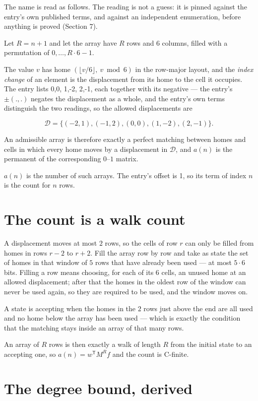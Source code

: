 \documentclass[11pt]{article}
\theoremstyle{definition}
\begin{document}
The name is read as follows. The reading is not a guess: it is pinned against the entry's own published terms, and against an independent enumeration, before anything is proved (Section 7).

Let $R = n + 1$ and let the array have $R$ rows and $6$ columns, filled with a permutation of $0,\dots,R\cdot6-1$.

The value $v$ has home $(\lfloor v/6\rfloor,\ v \bmod 6)$ in the row-major layout, and the {\itshape index change} of an element is the displacement from its home to the cell it occupies. The entry lists 0,0, 1,-2, 2,-1, each together with its negative --- the entry's $\pm(.,.)$ negates the displacement as a whole, and the entry's own terms distinguish the two readings, so the allowed displacements are

\[\mathcal{D} = \{(-2,1), (-1,2), (0,0), (1,-2), (2,-1)\}.\]

An admissible array is therefore exactly a perfect matching between homes and cells in which every home moves by a displacement in $\mathcal{D}$, and $a(n)$ is the permanent of the corresponding $0$--$1$ matrix.

$a(n)$ is the number of such arrays. The entry's offset is 1, so its term of index $n$ is the count for $n$ rows.

\section{The count is a walk count}

A displacement moves at most $2$ rows, so the cells of row $r$ can only be filled from homes in rows $r-2$ to $r+2$. Fill the array row by row and take as state the set of homes in that window of $5$ rows that have already been used --- at most $5\cdot6$ bits. Filling a row means choosing, for each of its $6$ cells, an unused home at an allowed displacement; after that the homes in the oldest row of the window can never be used again, so they are required to be used, and the window moves on.

A state is accepting when the homes in the $2$ rows just above the end are all used and no home below the array has been used --- which is exactly the condition that the matching stays inside an array of that many rows.

An array of $R$ rows is then exactly a walk of length $R$ from the initial state to an accepting one, so $a(n) = w^{\mathsf T}M^{R}f$ and the count is C-finite.

\section{The degree bound, derived}
\end{document}
